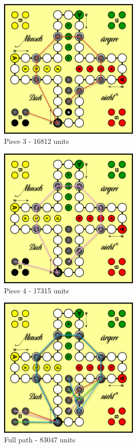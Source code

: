 \documentclass[12pt]{article}
\begin{document}
\begin{figure}[htbp]
    \centering
    \includegraphics[width=0.6\textwidth]{images/Figure10}
    \caption{Piece 3 - 16812 units}
    \label{fig:piece3}
\end{figure}

\begin{figure}[htbp]
    \centering
    \includegraphics[width=0.6\textwidth]{images/Figure11}
    \caption{Piece 4 - 17315 units}
    \label{fig:piece4}
\end{figure}

\begin{figure}[htbp]
    \centering
    \includegraphics[width=0.6\textwidth]{images/Figure12}
    \caption{Full path - 83047 units}
    \label{fig:full-path}
\end{figure}
\end{document}
